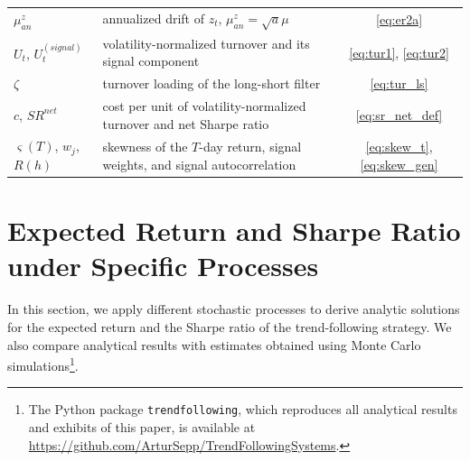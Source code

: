 \documentclass[hidelinks]{siamonline250211}
\begin{document}
\begin{table}[!htb]
\begin{tabular}{llc}
		$\mu^{z}_{an}$ & annualized drift of $z_{t}$, $\mu^{z}_{an}=\sqrt{a}\mu$ & \eqref{eq:er2a} \\
		$U_{t}$, $U^{(signal)}_{t}$ & volatility-normalized turnover and its signal component & \eqref{eq:tur1}, \eqref{eq:tur2} \\
		$\zeta$ & turnover loading of the long-short filter & \eqref{eq:tur_ls} \\
		$c$, $SR^{net}$ & cost per unit of volatility-normalized turnover and net Sharpe ratio & \eqref{eq:sr_net_def} \\
		$\varsigma(T)$, $w_{j}$, $R(h)$ & skewness of the $T$-day return, signal weights, and signal autocorrelation & \eqref{eq:skew_t}, \eqref{eq:skew_gen} \\
		\hline
	\end{tabular}
\end{table}



\section{Expected Return and Sharpe Ratio under Specific Processes}\label{sec:sp} 

In this section, we apply different stochastic processes to derive analytic solutions for the expected return and the Sharpe ratio of the trend-following strategy. We also compare analytical results with estimates obtained using Monte Carlo simulations\footnote{The Python package \texttt{trendfollowing}, which reproduces all analytical results and exhibits of this paper, is available at \url{https://github.com/ArturSepp/TrendFollowingSystems}.}.
\end{document}
